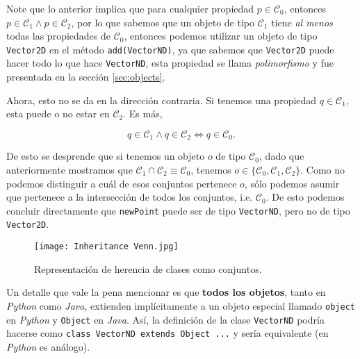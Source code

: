   Note que lo anterior implica que para cualquier propiedad \(p \in \mathcal{C}_0\), 
  entonces \(p \in \mathcal{C}_1 \wedge p \in \mathcal{C}_2\), por lo que sabemos que un 
  objeto de tipo \(\mathcal{C}_1\) tiene \textit{al menos} todas las propiedades de 
  \(\mathcal{C}_0\), entonces podemos utilizar un objeto de tipo \texttt{Vector2D} en el 
  método \texttt{add(VectorND)}, ya que sabemos que \texttt{Vector2D} puede 
  hacer todo lo que hace \texttt{VectorND}, esta propiedad se llama \textit{polimorfismo}
  y fue presentada en la sección \ref{sec:objects}.

  Ahora, esto no se da en la dirección contraria. 
  Si tenemos una propiedad \(q \in \mathcal{C}_1\), esta puede o no estar en 
  \(\mathcal{C}_2\).
  Es más, 
  
  \[  q \in \mathcal{C}_1 \wedge q \in \mathcal{C}_2 \iff q \in \mathcal{C}_0.  \]
  
  De esto se desprende que si tenemos un objeto \(o\) de tipo \(\mathcal{C}_0\), dado que 
  anteriormente mostramos que \(\mathcal{C}_1 \cap \mathcal{C}_2 \equiv \mathcal{C}_0\), 
  tenemos \(o \in \{\mathcal{C}_0, \mathcal{C}_1, \mathcal{C}_2\}\).
  Como no podemos distinguir a cuál de esos conjuntos pertenece \(o\), sólo podemos asumir
  que pertenece a la intersección de todos los conjuntos, i.e. \(\mathcal{C}_0\).
  De esto podemos concluir directamente que \texttt{newPoint} puede ser de tipo 
  \texttt{VectorND}, pero no de tipo \texttt{Vector2D}.

  \begin{figure}[ht!]
    \centering
    \texttt{[image: Inheritance Venn.jpg]}
    \caption{Representación de herencia de clases como conjuntos.}  
  \end{figure}

  \begin{note}
    Un detalle que vale la pena mencionar es que \textbf{todos los objetos}, tanto en 
    \textit{Python} como \textit{Java}, extienden implícitamente a un objeto especial 
    llamado \texttt{object} en \textit{Python} y \texttt{Object} en \textit{Java}.
    Así, la definición de la clase \texttt{VectorND} podría hacerse como 
    \texttt{class VectorND extends Object {...}} y sería equivalente 
    (en \textit{Python} es análogo).
  \end{note}

